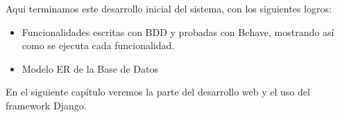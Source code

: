 \newpage
Aqui terminamos este desarrollo inicial del sistema, con los siguientes logros:

\begin{itemize}
    \item Funcionalidades escritas con BDD y probadas con Behave, mostrando así
      como se ejecuta cada funcionalidad.
    \item Modelo ER de la Base de Datos
\end{itemize}

En el siguiente capítulo veremos la parte del desarrollo web y el uso del
framework Django.



